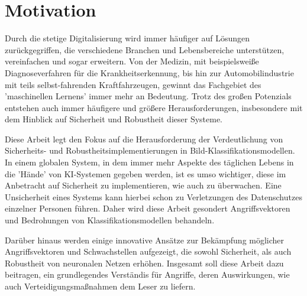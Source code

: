 \section{Motivation} \label{chpt:Einleitung_Motivation}

Durch die stetige Digitalisierung wird immer häufiger auf Lösungen zurückgegriffen, die verschiedene Branchen und Lebensbereiche unterstützen, vereinfachen und sogar erweitern. Von der Medizin, mit beispielsweiße Diagnoseverfahren für die Krankheitserkennung, bis hin zur Automobilindustrie mit teils selbst-fahrenden Kraftfahrzeugen, gewinnt das Fachgebiet des 'maschinellen Lernens' immer mehr an Bedeutung. Trotz des großen Potenzials entstehen auch immer häufigere und größere Herausforderungen, insbesondere mit dem Hinblick auf Sicherheit und Robustheit dieser Systeme.

Diese Arbeit legt den Fokus auf die Herausforderung der Verdeutlichung  von Sicherheits- und Robustheitsimplementierungen in Bild-Klassifikationsmodellen. In einem globalen System, in dem immer mehr Aspekte des täglichen Lebens in die 'Hände' von KI-Systemen gegeben werden, ist es umso wichtiger, diese im Anbetracht auf Sicherheit zu implementieren, wie auch zu überwachen. Eine Unsicherheit eines Systems kann hierbei schon zu Verletzungen des Datenschutzes einzelner Personen führen. Daher wird diese Arbeit gesondert  Angriffsvektoren und Bedrohungen von Klassifikationsmodellen behandeln.

Darüber hinaus werden einige innovative Ansätze zur Bekämpfung möglicher Angriffsvektoren und Schwachstellen aufgezeigt, die sowohl Sicherheit, als auch Robustheit von neuronalen Netzen erhöhen. Insgesamt soll diese Arbeit dazu beitragen, ein grundlegendes Verständis für Angriffe, deren Auswirkungen, wie auch Verteidigungsmaßnahmen dem Leser zu liefern. 

